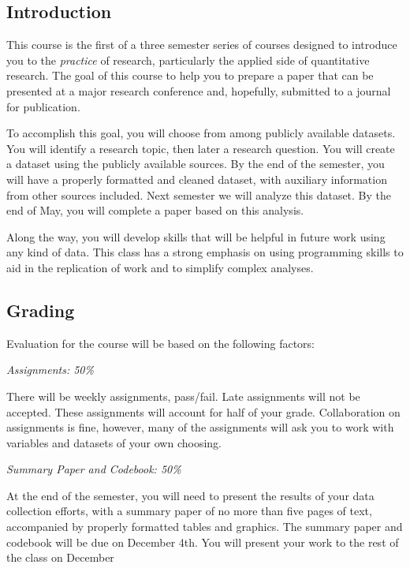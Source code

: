 \documentclass[12pt]{article}
\begin{document}
\subsection{Introduction}%
\begin{flushleft}

  This course is the first of a three semester series of courses
  designed to introduce you to the \textit{practice} of research,
  particularly the applied side of quantitative research. The goal of
  this course to help you to prepare a paper that can be presented at
  a major research conference and, hopefully, submitted to a journal
  for publication.

  To accomplish this goal, you will choose from among publicly
  available datasets. You will identify a research topic, then later a
  research question. You will create a dataset using the publicly
  available sources.  By the end of the semester, you will have a
  properly formatted and cleaned dataset, with auxiliary information
  from other sources included. Next semester we will analyze this
  dataset. By the end of May, you will complete a paper based on this
  analysis.

  Along the way, you will develop skills that will be helpful in
  future work using any kind of data. This class has a strong emphasis
  on using programming skills to aid in the replication of work and to
  simplify complex analyses.


\end{flushleft}

\subsection{Grading}%
\begin{flushleft}
Evaluation for the course will be based on the following factors:

\textit{Assignments: 50\%}

There will be weekly assignments,
pass/fail. Late assignments will not be accepted. These assignments
will account for half of your grade. Collaboration on assignments is
fine, however, many of the assignments will ask you to work with
variables and datasets of your own choosing.

\textit{Summary Paper and Codebook: 50\%}

At the end of the semester, you will need to present the results of
your data collection efforts, with a summary paper of no more than
five pages of text, accompanied by properly formatted tables and
graphics. The summary paper and codebook will be due on December
4th. You will present your work to the rest of the class on December



\end{flushleft}
\end{document}
